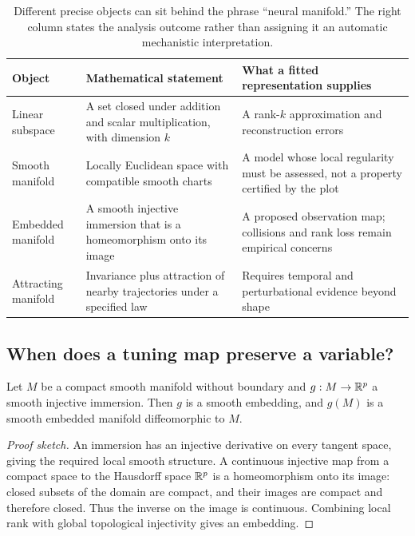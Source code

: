 \begin{table}[htbp]
\centering\small
\begin{tabularx}{\linewidth}{p{.20\linewidth}XX}
\toprule
Object & Mathematical statement & What a fitted representation supplies \\
\midrule
Linear subspace & A set closed under addition and scalar multiplication, with dimension $k$ & A rank-$k$ approximation and reconstruction errors \\
Smooth manifold & Locally Euclidean space with compatible smooth charts & A model whose local regularity must be assessed, not a property certified by the plot \\
Embedded manifold & A smooth injective immersion that is a homeomorphism onto its image & A proposed observation map; collisions and rank loss remain empirical concerns \\
Attracting manifold & Invariance plus attraction of nearby trajectories under a specified law & Requires temporal and perturbational evidence beyond shape \\
\bottomrule
\end{tabularx}
\caption{Different precise objects can sit behind the phrase ``neural manifold.'' The right column states the analysis outcome rather than assigning it an automatic mechanistic interpretation.}
\label{tab:08-manifold-usage}
\end{table}

\begin{samepage}
\section{When does a tuning map preserve a variable?}
\begin{proposition}
Let $M$ be a compact smooth manifold without boundary and $g:M\to\mathbb{R}^p$ a smooth injective immersion. Then $g$ is a smooth embedding, and $g(M)$ is a smooth embedded manifold diffeomorphic to $M$.
\end{proposition}
\end{samepage}
\begin{proof}[Proof sketch]
An immersion has an injective derivative on every tangent space, giving the required local smooth structure. A continuous injective map from a compact space to the Hausdorff space $\mathbb{R}^p$ is a homeomorphism onto its image: closed subsets of the domain are compact, and their images are compact and therefore closed. Thus the inverse on the image is continuous. Combining local rank with global topological injectivity gives an embedding.
\end{proof}

